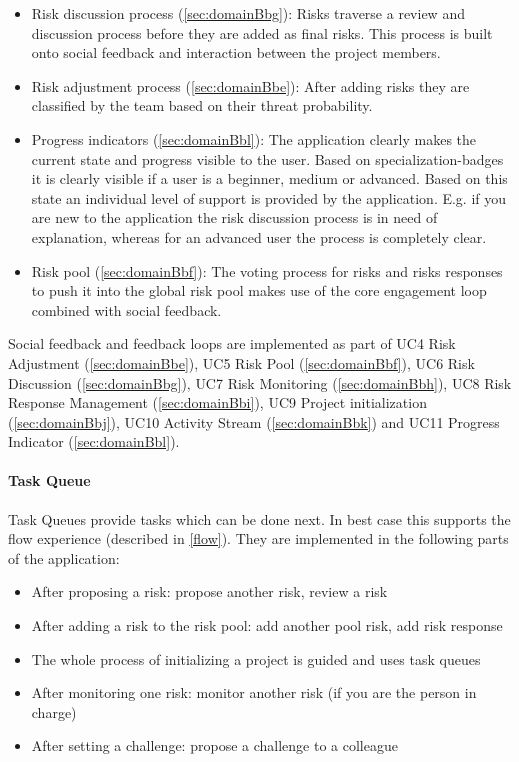 \begin{itemize}
	\item Risk discussion process (\ref{sec:domainBbg}): Risks traverse a review and discussion process before they are added as final risks. This process is built onto social feedback and interaction between the project members.
	\item Risk adjustment process (\ref{sec:domainBbe}): After adding risks they are classified by the team based on their threat probability.
	\item Progress indicators (\ref{sec:domainBbl}): The application clearly makes the current state and progress visible to the user. Based on specialization-badges it is clearly visible if a user is a beginner, medium or advanced. Based on this state an individual level of support is provided by the application. E.g. if you are new to the application the risk discussion process is in need of explanation, whereas for an advanced user the process is completely clear.
	\item Risk pool (\ref{sec:domainBbf}): The voting process for risks and risks responses to push it into the global risk pool makes use of the core engagement loop combined with social feedback.
\end{itemize}

Social feedback and feedback loops are implemented as part of \ac{UC}4 Risk Adjustment (\ref{sec:domainBbe}), \ac{UC}5 Risk Pool (\ref{sec:domainBbf}), \ac{UC}6 Risk Discussion (\ref{sec:domainBbg}), \ac{UC}7 Risk Monitoring (\ref{sec:domainBbh}), \ac{UC}8 Risk Response Management (\ref{sec:domainBbi}), \ac{UC}9 Project initialization (\ref{sec:domainBbj}), \ac{UC}10 Activity Stream (\ref{sec:domainBbk}) and \ac{UC}11 Progress Indicator (\ref{sec:domainBbl}).

\paragraph*{Task Queue}

Task Queues provide tasks which can be done next. In best case this supports the flow experience (described in \ref{flow}).
They are implemented in the following parts of the application:
\begin{itemize}
	\item After proposing a risk: propose another risk, review a risk
	\item After adding a risk to the risk pool: add another pool risk, add risk response
	\item The whole process of initializing a project is guided and uses task queues
	\item After monitoring one risk: monitor another risk (if you are the person in charge)
	\item After setting a challenge: propose a challenge to a colleague
\end{itemize}

